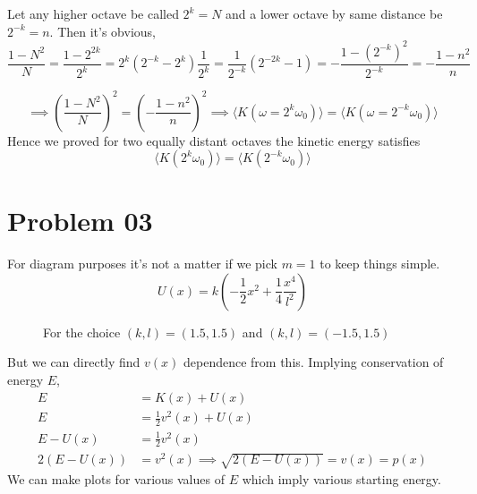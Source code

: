 \documentclass[12pt,letter]{article}
\begin{document}
Let any higher octave be called $2^k = N$ and a lower octave by same distance be $2^{-k} = n$. Then it's obvious, 
\[ \frac{1- N^2}{N} =  
	\frac{1 - 2^{2k}}{2^k} = 2^{k} (2^{-k} - 2^k) \frac{1}{2^k} = \frac{1}{2^{-k}} (2^{-2k} - 1  ) = - \frac{1 - (2^{-k})^2}{2^{-k}}  = - \frac{1 - n^2}{n} 
\]{  
\[
\implies \left(\frac{1-N^2}{N}\right)^2 = \left( - \frac{1-n^2}{n}		\right)^2
\implies \langle K (\omega = 2^{k} \omega_0) \rangle  = 
\langle K( \omega = 2^{-k}\omega_0)  \rangle 
\]Hence we proved for two equally distant octaves the kinetic energy satisfies
\[
\boxed{
\langle K (2^{k} \omega_0) \rangle = 
\langle K (2^{-k} \omega_0) \rangle 
}
\] 

\newpage 
\section*{Problem 03}

For diagram purposes it's not a matter if we pick $m = 1$ to keep things simple. 
\[
U(x) = k \left(
- \frac{1}{2}x^2 + \frac{1}{4}\frac{x^4}{l^2}
\right)
\]
\begin{figure}[H]
	\centering
	\hfill
	\caption{For the choice $(k,l) = (1.5, 1.5)$ and $(k,l) = (-1.5, 1.5)$}
	\label{}
\end{figure}
But we can directly find $v(x)$ dependence from this. Implying conservation of energy $E$, 
\begin{align*}
	E &= K(x ) + U(x) \\ 
E	&= \frac{1}{2} v^2(x) + U(x)  \\
E - U(x)	
	&=  \frac{1}{2}v^2(x)\\
2 ( E - U(x)) &= v^2(x)
\implies \sqrt{2 (E - U(x) ) } = v(x) = p(x)
\end{align*}
We can make plots for various values of $E$ which imply various starting energy. 


}
\end{document}
